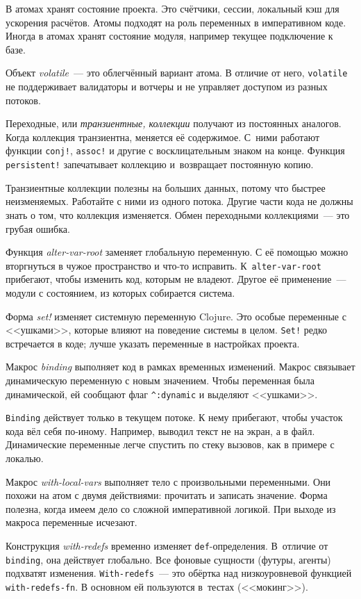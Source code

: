В атомах хранят состояние проекта. Это счётчики, сессии, локальный кэш
для ускорения расчётов. Атомы подходят на роль переменных в императивном
коде. Иногда в атомах хранят состояние модуля, например текущее подключение к
базе.

Объект \emph{volatile}~--- это облегчённый вариант атома. В отличие от него,
\verb|volatile| не поддерживает валидаторы и вотчеры и не управляет доступом
из разных потоков.

Переходные, или \emph{транзиентные, коллекции} получают из постоянных
аналогов. Когда коллекция транзиентна, меняется её содержимое. С~ними
работают функции \verb|conj!|, \verb|assoc!| и другие с восклицательным
знаком на конце. Функция \verb|persistent!| запечатывает коллекцию
и~возвращает постоянную копию.

Транзиентные коллекции полезны на больших данных, потому что быстрее
неизменяемых. Работайте с ними из одного потока. Другие части кода не должны
знать о том, что коллекция изменяется. Обмен переходными коллекциями~--- это грубая
ошибка.

Функция \emph{alter-var-root} заменяет глобальную переменную. С её помощью можно
вторгнуться в чужое пространство и что-то исправить. К~\verb|alter-var-root|
прибегают, чтобы изменить код, которым не владеют. Другое её применение~---
модули с состоянием, из которых собирается система.

Форма \emph{set!} изменяет системную переменную Clojure. Это особые переменные с
<<ушками>>, которые влияют на поведение системы в целом. \verb|Set!| редко
встречается в коде; лучше указать переменные в настройках проекта.

Макрос \emph{binding} выполняет код в рамках временных изменений. Макрос
связывает динамическую переменную с новым значением. Чтобы переменная была
динамической, ей сообщают флаг \verb|^:dynamic| и выделяют <<ушками>>.

\verb|Binding| действует только в текущем потоке. К нему прибегают, чтобы
участок кода вёл себя по-иному. Например, выводил текст не на экран, а в
файл. Динамические переменные легче спустить по стеку вызовов, как в примере с
локалью.

Макрос \emph{with-local-vars} выполняет тело с произвольными переменными. Они
похожи на атом с двумя действиями: прочитать и записать значение. Форма полезна,
когда имеем дело со сложной императивной логикой. При выходе из макроса
переменные исчезают.

Конструкция \emph{with-redefs} временно изменяет
\verb|def|-определения. В~отличие от \verb|binding|, она действует
глобально. Все фоновые сущности (футуры, агенты) подхватят
изменения. \verb|With-redefs|~--- это обёртка над низкоуровневой функцией
\verb|with-redefs-fn|. В основном ей пользуются в~тестах (<<мокинг>>).
